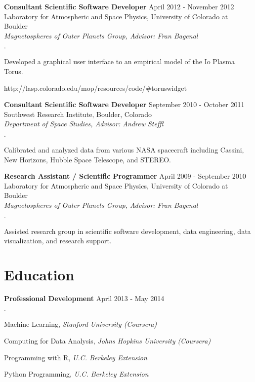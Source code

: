\documentclass[margin,line]{res}
\newenvironment{list2}{
  \begin{list}{$\cdot$}{%
      \setlength{\itemsep}{0in}
      \setlength{\parsep}{0in} \setlength{\parskip}{0in}
      \setlength{\topsep}{0in} \setlength{\partopsep}{0in} 
      \setlength{\leftmargin}{0.2in}}}{\end{list}}
\begin{document}
\begin{resume}
{\bf Consultant Scientific Software Developer} \hfill {April 2012 - November 2012}\\
Laboratory for Atmospheric and Space Physics, University of Colorado at Boulder\\
{\em Magnetospheres of Outer Planets Group, Advisor: Fran Bagenal}
\begin{list2}
\item Developed a graphical user interface to an empirical model of the Io Plasma Torus.
\item[] http://lasp.colorado.edu/mop/resources/code/\#toruswidget
\end{list2}

{\bf Consultant Scientific Software Developer} \hfill {September 2010 - October 2011}\\
Southwest Research Institute, Boulder, Colorado\\
{\em Department of Space Studies, Advisor: Andrew Steffl}
\begin{list2}
\item Calibrated and analyzed data from various NASA spacecraft including Cassini, New Horizons, Hubble Space Telescope, and STEREO.
\end{list2}

{\bf Research Assistant / Scientific Programmer} \hfill {April 2009 - September 2010}\\
Laboratory for Atmospheric and Space Physics, University of Colorado at Boulder\\
{\em Magnetospheres of Outer Planets Group, Advisor: Fran Bagenal}
\begin{list2}
\item Assisted research group in scientific software development, data engineering, data
  visualization, and research support.
\end{list2}


\section{\sc Education}

{\bf Professional Development} \hfill {April 2013 - May 2014}\\
\vspace*{-.15in}
\begin{list2}
\item Machine Learning, {\em Stanford University (Coursera)}
\item Computing for Data Analysis, {\em Johns Hopkins University (Coursera)}
\item Programming with R, {\em U.C. Berkeley Extension}
\item Python Programming, {\em U.C. Berkeley Extension}
\end{list2}


\end{resume}
\end{document}
